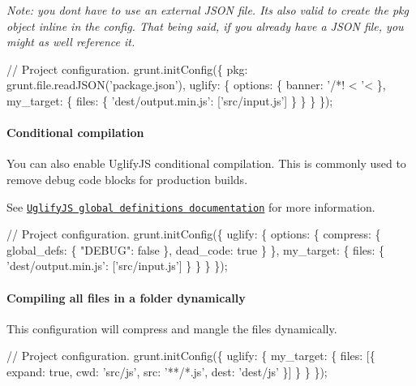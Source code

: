 {\itshape Note\+: you don\textquotesingle{}t have to use an external J\+S\+ON file. It\textquotesingle{}s also valid to create the {\ttfamily pkg} object inline in the config. That being said, if you already have a J\+S\+ON file, you might as well reference it.}


\begin{DoxyCode}
// Project configuration.
grunt.initConfig(\{
  pkg: grunt.file.readJSON('package.json'),
  uglify: \{
    options: \{
      banner: '/*! <%
        '<%
    \},
    my\_target: \{
      files: \{
        'dest/output.min.js': ['src/input.js']
      \}
    \}
  \}
\});
\end{DoxyCode}


\paragraph*{Conditional compilation}

You can also enable Uglify\+JS conditional compilation. This is commonly used to remove debug code blocks for production builds.

See \href{http://lisperator.net/uglifyjs/compress#global-defs}{\tt Uglify\+JS global definitions documentation} for more information.


\begin{DoxyCode}
// Project configuration.
grunt.initConfig(\{
  uglify: \{
    options: \{
      compress: \{
        global\_defs: \{
          "DEBUG": false
        \},
        dead\_code: true
      \}
    \},
    my\_target: \{
      files: \{
        'dest/output.min.js': ['src/input.js']
      \}
    \}
  \}
\});
\end{DoxyCode}


\paragraph*{Compiling all files in a folder dynamically}

This configuration will compress and mangle the files dynamically.


\begin{DoxyCode}
// Project configuration.
grunt.initConfig(\{
  uglify: \{
    my\_target: \{
      files: [\{
          expand: true,
          cwd: 'src/js',
          src: '**/*.js',
          dest: 'dest/js'
      \}]
    \}
  \}
\});
\end{DoxyCode}


